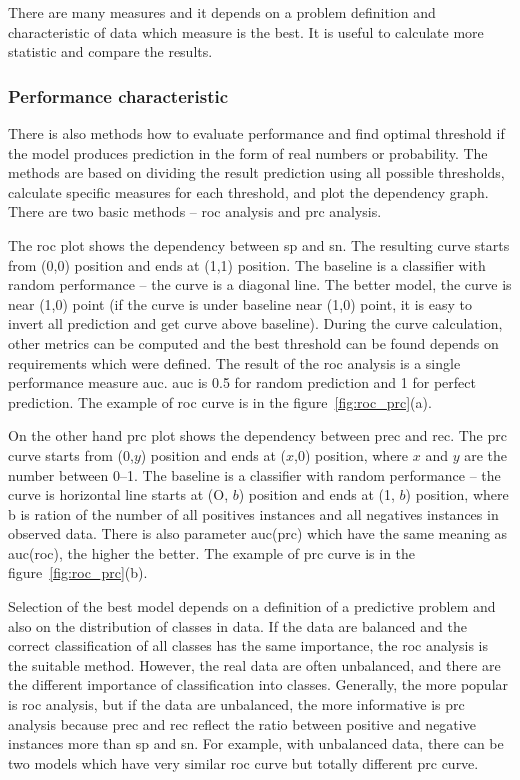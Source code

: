 \documentclass[thesis=M,english]{FITthesis}[2012/10/20]
\begin{document}
There are many measures and it depends on a problem definition and characteristic of data which measure is the best. It is useful to calculate more statistic and compare the results. 

\newpage
\subsubsection{Performance characteristic}\label{sec:roc}

There is also methods how to evaluate performance and find optimal threshold if the model produces prediction in the form of real numbers or probability. The methods are based on dividing the result prediction using all possible thresholds, calculate specific measures for each threshold, and plot the dependency graph. There are two basic methods -- \gls{roc} analysis and \gls{prc} analysis. \cite[4]{Saito2015rocprc}

The \gls{roc} plot shows the dependency between \gls{sp} and \gls{sn}. The resulting curve starts from (0,0) position and ends at (1,1) position. The baseline is a classifier with random performance -- the curve is a diagonal line. \cite[5]{Saito2015rocprc} The better model, the curve is near (1,0) point (if the curve is under baseline near (1,0) point, it is easy to invert all prediction and get curve above baseline). During the curve calculation, other metrics can be computed and the best threshold can be found depends on requirements which were defined. The result of the \gls{roc} analysis is a single performance measure \gls{auc}. \gls{auc} is 0.5 for random prediction and 1 for perfect prediction.\cite[5]{Saito2015rocprc} The example of \gls{roc} curve is in the figure~\ref{fig:roc_prc}(a).

On the other hand \gls{prc} plot shows the dependency between \gls{prec} and \gls{rec}. The \gls{prc} curve starts from (0,$y$) position and ends at ($x$,0) position, where $x$ and $y$ are the number between 0--1. The baseline is a classifier with random performance -- the curve is horizontal line starts at (O, $b$) position and ends at (1, $b$) position, where b is ration of the number of all positives instances and all negatives instances in observed data. \cite[19]{Saito2015rocprc} There is also parameter \gls{auc}(\gls{prc}) which have the same meaning as \gls{auc}(\gls{roc}), the higher the better. The example of \gls{prc} curve is in the figure~\ref{fig:roc_prc}(b).

Selection of the best model depends on a definition of a predictive problem and also on the distribution of classes in data. If the data are balanced and the correct classification of all classes has the same importance, the \gls{roc} analysis is the suitable method. However, the real data are often unbalanced, and there are the different importance of classification into classes. Generally, the more popular is \gls{roc} analysis, but if the data are unbalanced, the more informative is \gls{prc} analysis because \gls{prec} and \gls{rec} reflect the ratio between positive and negative instances more  than \gls{sp} and \gls{sn}.\cite[17-19]{Saito2015rocprc} For example, with unbalanced data, there can be two models which have very similar \gls{roc} curve but totally different \gls{prc} curve.\cite[4-5]{Davis2016rocprc}
\end{document}
